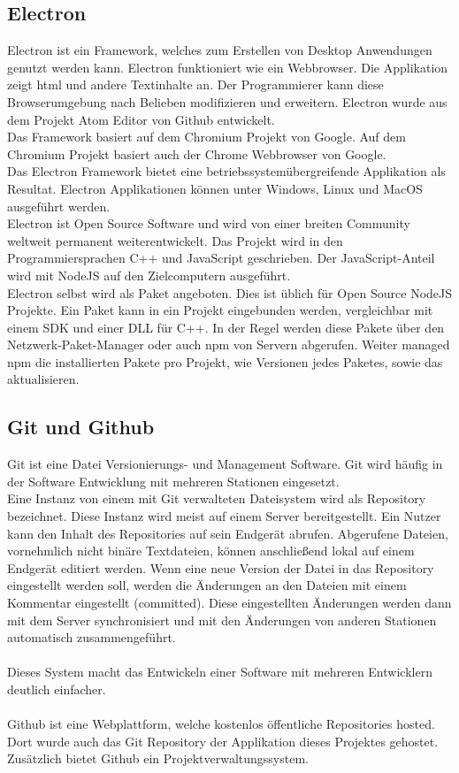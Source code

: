 \documentclass[11pt]{scrartcl}
\begin{document}
\subsection{Electron}
Electron ist ein Framework, welches zum Erstellen von Desktop Anwendungen genutzt werden kann. Electron funktioniert
wie ein Webbrowser. Die Applikation zeigt \ac{html} und andere Textinhalte an.\cite{electron} Der Programmierer kann diese
Browserumgebung nach Belieben modifizieren und erweitern. Electron wurde aus dem Projekt Atom Editor von Github entwickelt.\\
Das Framework basiert auf dem Chromium Projekt von Google. Auf dem Chromium Projekt basiert auch der Chrome Webbrowser von
Google.\\
Das Electron Framework bietet eine betriebssystemübergreifende Applikation als Resultat. Electron Applikationen können unter
Windows, Linux und MacOS ausgeführt werden.\\
Electron ist Open Source Software und wird von einer breiten Community weltweit permanent weiterentwickelt.\cite{electron} Das Projekt wird
in den Programmiersprachen C++ und JavaScript geschrieben. Der JavaScript-Anteil wird mit NodeJS auf den Zielcomputern ausgeführt.\\
Electron selbst wird als Paket angeboten. Dies ist üblich für Open Source NodeJS Projekte. Ein Paket kann in ein Projekt eingebunden werden,
vergleichbar mit einem SDK und einer DLL für C++. In der Regel werden diese Pakete über den Netzwerk-Paket-Manager oder auch \ac{npm} von
Servern abgerufen. Weiter managed \ac{npm} die installierten Pakete pro Projekt, wie Versionen jedes Paketes, sowie das aktualisieren.

\subsection{Git und Github}
Git ist eine Datei Versionierungs- und Management Software. Git wird häufig in der Software Entwicklung mit mehreren Stationen eingesetzt.\\
Eine Instanz von einem mit Git verwalteten Dateisystem wird als Repository bezeichnet. Diese Instanz wird meist auf einem Server bereitgestellt.
Ein Nutzer kann den Inhalt des Repositories auf sein Endgerät abrufen.
Abgerufene Dateien, vornehmlich nicht binäre Textdateien, können anschließend lokal auf einem Endgerät editiert werden. Wenn eine neue Version
der Datei in das Repository eingestellt werden soll, werden die Änderungen an den Dateien mit einem Kommentar eingestellt (committed).
Diese eingestellten Änderungen werden dann mit dem Server synchronisiert und mit den Änderungen von anderen Stationen automatisch zusammengeführt.\\
\\
Dieses System macht das Entwickeln einer Software mit mehreren Entwicklern deutlich einfacher.\\
\\
Github ist eine Webplattform, welche kostenlos öffentliche Repositories hosted. Dort wurde auch das Git Repository der Applikation
dieses Projektes gehostet.\\
Zusätzlich bietet Github ein Projektverwaltungssystem.
\clearpage
\end{document}
